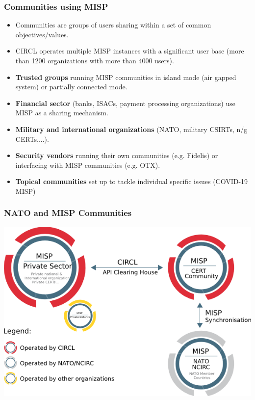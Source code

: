 \begin{frame}
 \frametitle{Communities using MISP}
 \begin{itemize}
	 \item Communities are groups of users sharing within a set of common objectives/values.
	 \item CIRCL operates multiple MISP instances with a significant user base (more than 1200 organizations with more than 4000 users).
         \item {\bf Trusted groups} running MISP communities in island mode (air gapped system) or partially connected mode.
	 \item {\bf Financial sector} (banks, ISACs, payment processing organizations) use MISP as a sharing mechanism.
	 \item {\bf Military and international organizations} (NATO, military CSIRTs, n/g CERTs,...).
	 \item {\bf Security vendors} running their own communities (e.g. Fidelis) or interfacing with MISP communities (e.g. OTX).
         \item {\bf Topical communities} set up to tackle individual specific issues (COVID-19 MISP)
 \end{itemize}
\end{frame}

\begin{frame}
  \frametitle{NATO and MISP Communities}
  \begin{center}
      \includegraphics[scale=0.5]{misp-flows.png}
  \end{center}
\end{frame}

